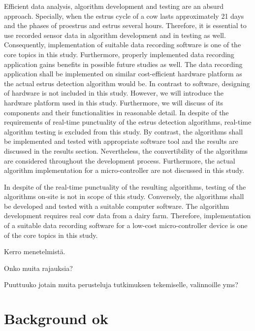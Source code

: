 \documentclass[english,12pt,a4paper,pdftex,elec,utf8]{aaltothesis}
\begin{document}
Efficient data analysis, algorithm development and testing are an absurd approach. Specially, when the estrus cycle of a cow lasts approximately 21 days and the phases of proestrus and estrus several hours. Therefore, it is essential to use recorded sensor data in algorithm development and in testing as well. Consequently, implementation of suitable data recording software is one of the core topics in this study. Furthermore, properly implemented data recording application gains benefits in possible future studies as well. The data recording application shall be implemented on similar cost-efficient hardware platform as the actual estrus detection algorithm would be. In contrast to software, designing of hardware is not included in this study. However, we will introduce the hardware platform used in this study. Furthermore, we will discuss of its components and their functionalities in reasonable detail. In despite of the requirements of real-time punctuality of the estrus detection algorithms, real-time algorithm testing is excluded from this study. By contrast, the algorithms shall be implemented and tested with appropriate software tool and the results are discussed in the results section. Nevertheless, the convertibility of the algorithms are considered throughout the development process. Furthermore, the actual algorithm implementation for a micro-controller are not discussed in this study.


In despite of the real-time punctuality of the resulting algorithms, testing of the algorithms on-site is not in scope of this study. Conversely, the algorithms shall be developed and tested with a suitable computer software. The algorithm development requires real cow data from a dairy farm. Therefore, implementation of a suitable data recording software for a low-cost micro-controller device is one of the core topics in this study. 


Kerro menetelmistä.

Onko muita rajauksia?

Puuttuuko jotain muita perusteluja tutkimuksen tekemiselle, valinnoille yms?



\clearpage 
 
\section{Background ok} \label{backgroundsection}
 
\end{document}
